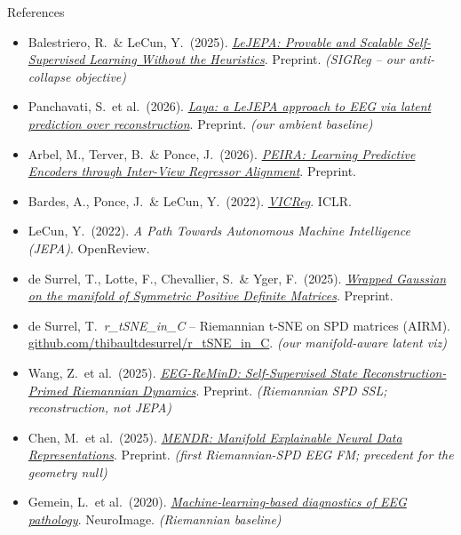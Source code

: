 \documentclass[aspectratio=169]{beamer}
\begin{document}
\begin{frame}[allowframebreaks]{References}
  \small
  \begin{itemize}
    \item Balestriero, R.\ \& LeCun, Y.\ (2025). \href{https://arxiv.org/abs/2511.08544}{\textit{LeJEPA: Provable and Scalable Self-Supervised Learning Without the Heuristics}}. Preprint. \emph{(SIGReg -- our anti-collapse objective)}
    \item Panchavati, S.\ et al.\ (2026). \href{https://arxiv.org/abs/2603.16281}{\textit{Laya: a LeJEPA approach to EEG via latent prediction over reconstruction}}. Preprint. \emph{(our ambient baseline)}
    \item Arbel, M., Terver, B.\ \& Ponce, J.\ (2026). \href{https://arxiv.org/abs/2605.17671}{\textit{PEIRA: Learning Predictive Encoders through Inter-View Regressor Alignment}}. Preprint.
    \item Bardes, A., Ponce, J.\ \& LeCun, Y.\ (2022). \href{https://arxiv.org/abs/2105.04906}{\textit{VICReg}}. ICLR.
    \item LeCun, Y.\ (2022). \textit{A Path Towards Autonomous Machine Intelligence (JEPA)}. OpenReview.
    \item de Surrel, T., Lotte, F., Chevallier, S.\ \& Yger, F.\ (2025). \href{https://arxiv.org/abs/2502.01512}{\textit{Wrapped Gaussian on the manifold of Symmetric Positive Definite Matrices}}. Preprint.
    \item de Surrel, T.\ \textit{r\_tSNE\_in\_C} -- Riemannian t-SNE on SPD matrices (AIRM). \href{https://github.com/thibaultdesurrel/r_tSNE_in_C}{github.com/thibaultdesurrel/r\_tSNE\_in\_C}. \emph{(our manifold-aware latent viz)}
    \item Wang, Z.\ et al.\ (2025). \href{https://arxiv.org/abs/2501.08139}{\textit{EEG-ReMinD: Self-Supervised State Reconstruction-Primed Riemannian Dynamics}}. Preprint. \emph{(Riemannian SPD SSL; reconstruction, not JEPA)}
    \item Chen, M.\ et al.\ (2025). \href{https://arxiv.org/abs/2508.04956}{\textit{MENDR: Manifold Explainable Neural Data Representations}}. Preprint. \emph{(first Riemannian-SPD EEG FM; precedent for the geometry null)}
    \item Gemein, L.\ et al.\ (2020). \href{https://arxiv.org/abs/2002.05115}{\textit{Machine-learning-based diagnostics of EEG pathology}}. NeuroImage. \emph{(Riemannian baseline)}

\end{itemize}
\end{frame}
\end{document}
